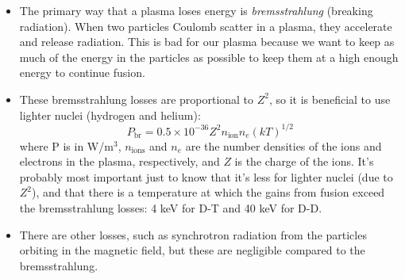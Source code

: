 \documentclass[letter]{article}
\begin{document}
\begin{itemize}
\item The primary way that a plasma loses energy is
  \textit{bremsstrahlung} (breaking radiation). When two particles Coulomb scatter in a
  plasma, they accelerate and release radiation. This is bad for our
  plasma because we want to keep as much of the energy in the
  particles as possible to keep them at a high enough energy to
  continue fusion.~\cite[pp. 539]{krane}
\item These bremsstrahlung losses are proportional to $Z^2$, so it is
  beneficial to use lighter nuclei (hydrogen and helium):
  \begin{equation*}
    P_{\text{br}}=0.5\times 10^{-36}Z^2n_{\text{ion}}n_e{(kT)}^{1/2}
  \end{equation*}
where P is in W/m$^3$, $n_{\text{ions}}$ and $n_e$ are the number
densities of the ions and electrons in the plasma, respectively, and $Z$ is the
charge of the ions. It's probably most important just to know that it's less
for lighter nuclei (due to $Z^2$), and that there is a temperature at which the gains
from fusion exceed the bremsstrahlung losses: 4 keV for D-T and 40 keV
for D-D.~\cite[pp. 540]{krane}
\item There are other losses, such as synchrotron radiation from the
  particles orbiting in the magnetic field, but these are negligible
  compared to the bremsstrahlung.~\cite[pp. 539]{krane}
\end{itemize}
\end{document}
